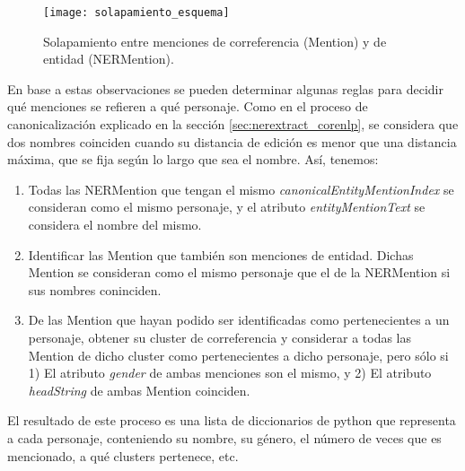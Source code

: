 \documentclass{pre-tfg}
\begin{document}

\begin{figure}
	\centering
	\texttt{[image: solapamiento\_esquema]}
	\caption{Solapamiento entre menciones de correferencia (Mention) y de entidad (NERMention).}
	\label{fig:solapamiento_esquema}
\end{figure}

En base a estas observaciones se pueden determinar algunas reglas para decidir qué menciones se refieren a qué personaje. Como en el proceso de canonicalización explicado en la sección \ref{sec:nerextract_corenlp}, se considera que dos nombres coinciden cuando su distancia de edición\cite{levenshtein_1966} es menor que una distancia máxima, que se fija según lo largo que sea el nombre. Así, tenemos:

\begin{enumerate}
	\item Todas las NERMention que tengan el mismo \textit{canonicalEntityMentionIndex} se consideran como el mismo personaje, y el atributo \textit{entityMentionText} se considera el nombre del mismo.
	\item Identificar las Mention que también son menciones de entidad. Dichas Mention se consideran como el mismo personaje que el de la NERMention si sus nombres coninciden.
	\item De las Mention que hayan podido ser identificadas como pertenecientes a un personaje, obtener su cluster de correferencia y considerar a todas las Mention de dicho cluster como pertenecientes a dicho personaje, pero sólo si 1) El atributo \textit{gender} de ambas menciones son el mismo, y 2) El atributo \textit{headString} de ambas Mention coinciden.
\end{enumerate}

El resultado de este proceso es una lista de diccionarios de python que representa a cada personaje, conteniendo su nombre, su género, el número de veces que es mencionado, a qué clusters pertenece, etc.
\end{document}
